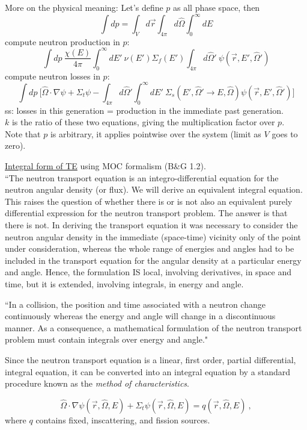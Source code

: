 \documentclass[12pt]{article}
\newcommand{\rvec}{\ensuremath{\vec{r}}}
\newcommand{\vOmega}{\ensuremath{\hat{\Omega}}}
\begin{document}
More on the physical meaning: Let's define $p$ as all phase space, then
  \[\int dp = \int_{V} d\rvec \int_{4 \pi} d\vOmega \int_0^{\infty} dE\]
compute neutron production in $p$:
  \[\int dp\:\frac{\chi(E)}{4 \pi}\int_0^{\infty} dE' \: \nu(E') \Sigma_f(E') \int_{4 \pi} d\vOmega' \:\psi(\vec{r}, E', \vOmega') \]
compute neutron losses in $p$:
  \[\int dp\:\biggl[\vOmega \cdot \nabla \psi + \Sigma_t \psi - \int_{4 \pi} d\vOmega' \int_0^{\infty} dE' \: \Sigma_s(E', \vOmega' \rightarrow E, \vOmega) \psi(\vec{r}, E', \vOmega') \biggr] \]
ss: losses in this generation = production in the immediate past generation.\\
$k$ is the ratio of these two equations, giving the multiplication factor over $p$.\\
Note that $p$ is arbitrary, it applies pointwise over the system (limit as $V$ goes to zero).



\clearpage
\underline{Integral form of TE} using MOC formalism (B\&G 1.2).\\
``The neutron transport equation is an integro-differential equation for the
neutron angular density (or flux). We will derive an equivalent integral equation. This raises the question of whether there is or is not also an
equivalent purely differential expression for the neutron transport problem.
The answer is that there is not. In deriving the transport
equation it was necessary to consider the neutron angular density in the 
immediate (space-time) vicinity only of the point under consideration, whereas the
whole range of energies and angles had to be included in the transport equation
for the angular density at a particular energy and angle. Hence, the formulation
IS local, involving derivatives, in space and time, but it is extended, involving
integrals, in energy and angle.

``In a collision, the position
and time associated with a neutron change continuously whereas the energy and
angle will change in a discontinuous manner. As a consequence, a mathematical
formulation of the neutron transport problem must contain integrals over energy
and angle."

Since the neutron transport equation is a linear, first order, partial differential,
integral equation, it can be converted into an integral equation by a standard
procedure known as the \textit{method of characteristics}.

\[\vOmega \cdot \nabla \psi(\rvec, \vOmega, E) + \Sigma_t \psi(\rvec, \vOmega, E) = q(\rvec, \vOmega, E)\:,\]
where $q$ contains fixed, inscattering, and fission sources. \\
\end{document}

